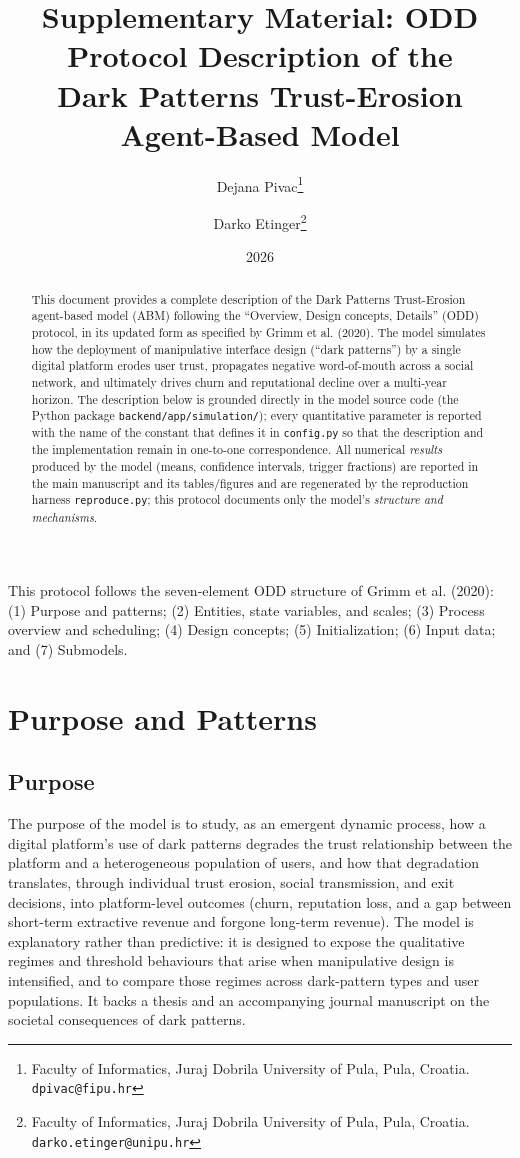 \documentclass[11pt]{article}
\title{Supplementary Material: ODD Protocol Description of the\\
Dark Patterns Trust-Erosion Agent-Based Model}
\author{%
Dejana Pivac\thanks{Faculty of Informatics, Juraj Dobrila University of Pula, Pula, Croatia. \texttt{dpivac@fipu.hr}}
\and
Darko Etinger\thanks{Faculty of Informatics, Juraj Dobrila University of Pula, Pula, Croatia. \texttt{darko.etinger@unipu.hr}}
}
\date{2026}
\newcommand{\code}[1]{\texttt{#1}}
\begin{document}
\maketitle

\begin{abstract}
\noindent This document provides a complete description of the Dark Patterns
Trust-Erosion agent-based model (ABM) following the ``Overview, Design concepts,
Details'' (ODD) protocol, in its updated form as specified by
Grimm et al. (2020). The model simulates how the deployment of manipulative
interface design (``dark patterns'') by a single digital platform erodes user
trust, propagates negative word-of-mouth across a social network, and ultimately
drives churn and reputational decline over a multi-year horizon. The description
below is grounded directly in the model source code (the Python package
\code{backend/app/simulation/}); every quantitative parameter is reported with
the name of the constant that defines it in \code{config.py} so that the
description and the implementation remain in one-to-one correspondence.
All numerical \emph{results} produced by the model (means, confidence intervals,
trigger fractions) are reported in the main manuscript and its tables/figures and
are regenerated by the reproduction harness \code{reproduce.py}; this protocol
documents only the model's \emph{structure and mechanisms}.
\end{abstract}

\tableofcontents

\bigskip

This protocol follows the seven-element ODD structure of
Grimm et al. (2020): (1) Purpose and patterns; (2) Entities, state variables,
and scales; (3) Process overview and scheduling; (4) Design concepts;
(5) Initialization; (6) Input data; and (7) Submodels.

\section{Purpose and Patterns}
\label{sec:purpose}

\subsection{Purpose}

The purpose of the model is to study, as an emergent dynamic process, how a
digital platform's use of dark patterns degrades the trust relationship between
the platform and a heterogeneous population of users, and how that degradation
translates, through individual trust erosion, social transmission, and
exit decisions, into platform-level outcomes (churn, reputation loss, and a
gap between short-term extractive revenue and forgone long-term revenue). The
model is explanatory rather than predictive: it is designed to expose the
qualitative regimes and threshold behaviours that arise when manipulative design
is intensified, and to compare those regimes across dark-pattern types and user
populations. It backs a thesis and an accompanying journal manuscript on the
societal consequences of dark patterns.
\end{document}
